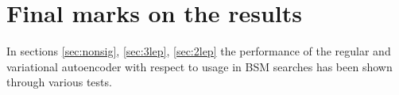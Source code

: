 \section{Final marks on the results}
In sections \ref{sec:nonsig}, \ref{sec:3lep}, \ref{sec:2lep} the performance of the regular and variational autoencoder 
with respect to usage in BSM searches has been shown through various tests. 